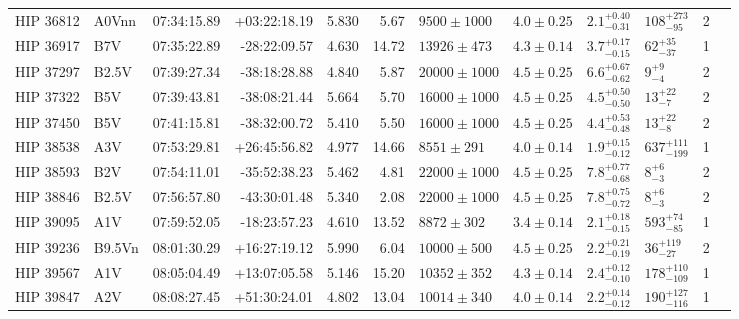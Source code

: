 \begin{tiny}
\begin{longtable}{|l|lrrrrllllll|}
   HIP 36812 &    A0Vnn &    07:34:15.89 &   +03:22:18.19 &   5.830 &      5.67 &   $9500 \pm 1000$ &  $4.0 \pm 0.25$ &  $2.1^{+0.40}_{-0.31}$ &    $108^{+273}_{-95}$ &       2 \\
   HIP 36917 &      B7V &    07:35:22.89 &   -28:22:09.57 &   4.630 &     14.72 &   $13926 \pm 473$ &  $4.3 \pm 0.14$ &  $3.7^{+0.17}_{-0.15}$ &      $62^{+35}_{-37}$ &       1 \\
   HIP 37297 &    B2.5V &    07:39:27.34 &   -38:18:28.88 &   4.840 &      5.87 &  $20000 \pm 1000$ &  $4.5 \pm 0.25$ &  $6.6^{+0.67}_{-0.62}$ &         $9^{+9}_{-4}$ &       2 \\
   HIP 37322 &      B5V &    07:39:43.81 &   -38:08:21.44 &   5.664 &      5.70 &  $16000 \pm 1000$ &  $4.5 \pm 0.25$ &  $4.5^{+0.50}_{-0.50}$ &       $13^{+22}_{-7}$ &       2 \\
   HIP 37450 &      B5V &    07:41:15.81 &   -38:32:00.72 &   5.410 &      5.50 &  $16000 \pm 1000$ &  $4.5 \pm 0.25$ &  $4.4^{+0.53}_{-0.48}$ &       $13^{+22}_{-8}$ &       2 \\
   HIP 38538 &      A3V &    07:53:29.81 &   +26:45:56.82 &   4.977 &     14.66 &    $8551 \pm 291$ &  $4.0 \pm 0.14$ &  $1.9^{+0.15}_{-0.12}$ &   $637^{+111}_{-199}$ &       1 \\
   HIP 38593 &      B2V &    07:54:11.01 &   -35:52:38.23 &   5.462 &      4.81 &  $22000 \pm 1000$ &  $4.5 \pm 0.25$ &  $7.8^{+0.77}_{-0.68}$ &         $8^{+6}_{-3}$ &       2 \\
   HIP 38846 &    B2.5V &    07:56:57.80 &   -43:30:01.48 &   5.340 &      2.08 &  $22000 \pm 1000$ &  $4.5 \pm 0.25$ &  $7.8^{+0.75}_{-0.72}$ &         $8^{+6}_{-3}$ &       2 \\
   HIP 39095 &      A1V &    07:59:52.05 &   -18:23:57.23 &   4.610 &     13.52 &    $8872 \pm 302$ &  $3.4 \pm 0.14$ &  $2.1^{+0.18}_{-0.15}$ &     $593^{+74}_{-85}$ &       1 \\
   HIP 39236 &   B9.5Vn &    08:01:30.29 &   +16:27:19.12 &   5.990 &      6.04 &   $10000 \pm 500$ &  $4.5 \pm 0.25$ &  $2.2^{+0.21}_{-0.19}$ &     $36^{+119}_{-27}$ &       2 \\
   HIP 39567 &      A1V &    08:05:04.49 &   +13:07:05.58 &   5.146 &     15.20 &   $10352 \pm 352$ &  $4.3 \pm 0.14$ &  $2.4^{+0.12}_{-0.10}$ &   $178^{+110}_{-109}$ &       1 \\
   HIP 39847 &      A2V &    08:08:27.45 &   +51:30:24.01 &   4.802 &     13.04 &   $10014 \pm 340$ &  $4.0 \pm 0.14$ &  $2.2^{+0.14}_{-0.12}$ &   $190^{+127}_{-116}$ &       1 \\

\end{longtable}
\end{tiny}
